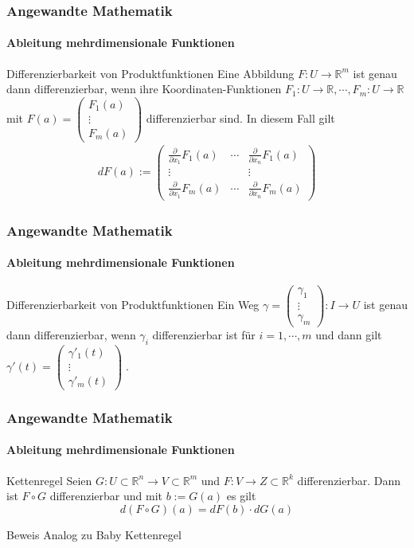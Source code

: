\documentclass{beamer}
\begin{document}
\begin{frame}
    \frametitle{Angewandte Mathematik}
\framesubtitle{Ableitung mehrdimensionale Funktionen}
    \begin{block}{Differenzierbarkeit von Produktfunktionen}
Eine Abbildung $F : U \to \mathbb{R}^m$ ist genau dann  differenzierbar, wenn ihre Koordinaten-Funktionen 
$F_1 : U \to \mathbb{R},  \cdots, F_m : U \to \mathbb{R}$ mit $F(a) = \begin{pmatrix} F_1(a) \\ \vdots \\ F_m(a) \end{pmatrix}$ differenzierbar sind. In diesem Fall gilt
\begin{align*}
dF(a) :=   \begin{pmatrix}  \frac{\partial}{\partial x_1}  F_1(a) & \cdots & \frac{\partial}{\partial x_n} F_1(a) \\ 
\vdots & & \vdots \\
\frac{\partial}{\partial x_1}  F_m(a) & \cdots & \frac{\partial}{\partial x_n} F_m(a) 
\end{pmatrix}
\end{align*}
\end{block}
 \end{frame}



\begin{frame}
    \frametitle{Angewandte Mathematik}
\framesubtitle{Ableitung mehrdimensionale Funktionen}
    \begin{block}{Differenzierbarkeit von Produktfunktionen}
Ein Weg $\gamma =  \begin{pmatrix} \gamma_1  \\ \vdots \\ \gamma_m \end{pmatrix} : I \to U$ ist genau dann differenzierbar, wenn $\gamma_i$ differenzierbar ist für $i= 1, \cdots, m$ und dann gilt $\gamma'(t) =   \begin{pmatrix} \gamma'_1(t)  \\ \vdots \\ \gamma'_m(t) \end{pmatrix} \; .$

\end{block}
 \end{frame}


\begin{frame}
    \frametitle{Angewandte Mathematik}
\framesubtitle{Ableitung mehrdimensionale Funktionen}
    \begin{block}{Kettenregel}
Seien $G:  U \subset \mathbb{R}^n \to V \subset \mathbb{R}^m$ und $F: V \to Z \subset \mathbb{R}^k$ differenzierbar. Dann ist $F \circ G$ differenzierbar und mit $b := G(a)$ es gilt
$$ d(F \circ G)(a) = dF(b) \cdot dG(a) $$
\end{block}
    \begin{block}{Beweis}
Analog zu Baby Kettenregel
\end{block}
 \end{frame}
\end{document}
